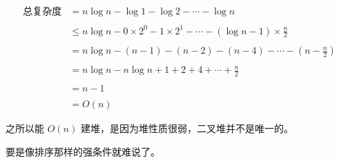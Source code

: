 $$
\begin{aligned}
总复杂度 & = n \log n - \log 1 - \log 2 - \cdots - \log n \\\\
& \leq n \log n - 0 \times 2^0 - 1 \times 2^1 -\cdots - (\log n - 1) \times \frac{n}{2} \\\\
& = n \log n - (n-1) - (n-2) - (n-4) - \cdots - (n-\frac{n}{2}) \\\\
& = n \log n - n \log n + 1 + 2 + 4 + \cdots + \frac{n}{2} \\\\
& = n - 1 \\\\ &  = O(n)
\end{aligned}
$$

之所以能 $O(n)$ 建堆，是因为堆性质很弱，二叉堆并不是唯一的。

要是像排序那样的强条件就难说了。
